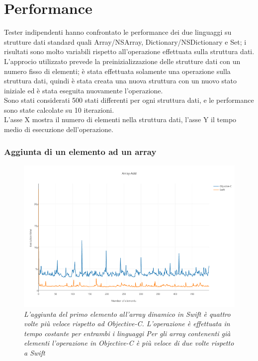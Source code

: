 \section{Performance}
Tester indipendenti hanno confrontato le performance dei due linguaggi su strutture dati standard quali Array/NSArray, Dictionary/NSDictionary e Set; i risultati sono molto variabili rispetto all'operazione effettuata sulla struttura dati.\\
L'approcio utilizzato prevede la preinizializzazione delle strutture dati con un numero fisso di elementi; è stata effettuata solamente una operazione sulla struttura dati, quindi è stata creata una nuova struttura con un nuovo stato iniziale ed è stata eseguita nuovamente l'operazione.\\ Sono stati considerati 500 stati differenti per ogni struttura dati, e le performance sono state calcolate su 10 iterazioni.\\L'asse X mostra il numero di elementi nella struttura dati, l'asse Y il tempo medio di esecuzione dell'operazione.
\subsubsection{Aggiunta di un elemento ad un array}
\begin{figure}[H]
      \centering
      \includegraphics[scale=0.50]{immagini/array_add.png}
            \vspace{0.8cm}
            \caption{\textit{L'aggiunta del primo elemento all'array dinamico in Swift è quattro volte più veloce rispetto ad Objective-C.
L'operazione è effettuata in tempo costante per entrambi i linguaggi
Per gli array contenenti già elementi l'operazione in Objective-C è più veloce di due volte rispetto a Swift}}
\end{figure}
